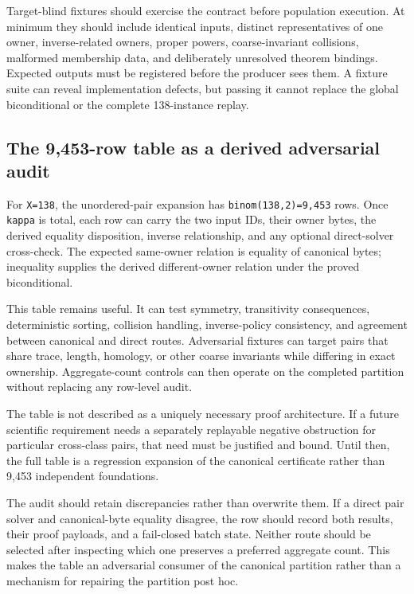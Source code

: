 \documentclass[11pt]{article}
\begin{document}
Target-blind fixtures should exercise the contract before population
execution. At minimum they should include identical inputs, distinct
representatives of one owner, inverse-related owners, proper powers,
coarse-invariant collisions, malformed membership data, and deliberately
unresolved theorem bindings. Expected outputs must be registered before
the producer sees them. A fixture suite can reveal implementation
defects, but passing it cannot replace the global biconditional or the
complete 138-instance replay.

\hypertarget{43-the-9453-row-table-as-a-derived-adversarial-audit}{%
\subsection{The 9,453-row table as a derived adversarial
audit}\label{43-the-9453-row-table-as-a-derived-adversarial-audit}}

For \texttt{\textbar{}X\textbar{}=138}, the unordered-pair expansion has
\texttt{binom(138,2)=9,453} rows. Once \texttt{kappa} is total, each row
can carry the two input IDs, their owner bytes, the derived equality
disposition, inverse relationship, and any optional direct-solver
cross-check. The expected same-owner relation is equality of canonical
bytes; inequality supplies the derived different-owner relation under
the proved biconditional.

This table remains useful. It can test symmetry, transitivity
consequences, deterministic sorting, collision handling, inverse-policy
consistency, and agreement between canonical and direct routes.
Adversarial fixtures can target pairs that share trace, length,
homology, or other coarse invariants while differing in exact ownership.
Aggregate-count controls can then operate on the completed partition
without replacing any row-level audit.

The table is not described as a uniquely necessary proof architecture.
If a future scientific requirement needs a separately replayable
negative obstruction for particular cross-class pairs, that need must be
justified and bound. Until then, the full table is a regression
expansion of the canonical certificate rather than 9,453 independent
foundations.

The audit should retain discrepancies rather than overwrite them. If a
direct pair solver and canonical-byte equality disagree, the row should
record both results, their proof payloads, and a fail-closed batch state.
Neither route should be selected after inspecting which one preserves a
preferred aggregate count. This makes the table an adversarial consumer
of the canonical partition rather than a mechanism for repairing the
partition post hoc.
\end{document}
